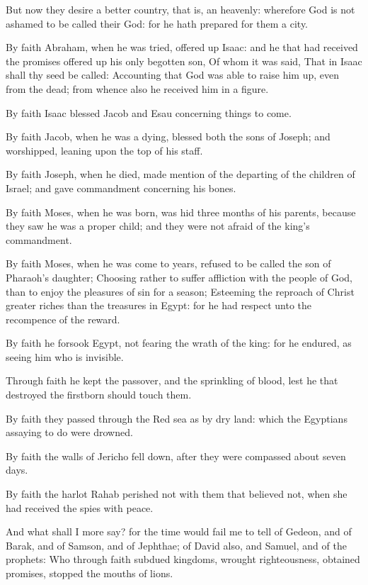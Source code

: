 \Verse But now they desire a better country, that is, an heavenly: wherefore God is not ashamed to be called their God: for he hath prepared for them a city.

\Verse By faith Abraham, when he was tried, offered up Isaac: and he that had received the promises offered up his only begotten son, \Verse Of whom it was said, That in Isaac shall thy seed be called: \Verse Accounting that God was able to raise him up, even from the dead; from whence also he received him in a figure.

\Verse By faith Isaac blessed Jacob and Esau concerning things to come.

\Verse By faith Jacob, when he was a dying, blessed both the sons of Joseph; and worshipped, leaning upon the top of his staff.

\Verse By faith Joseph, when he died, made mention of the departing of the children of Israel; and gave commandment concerning his bones.

\Verse By faith Moses, when he was born, was hid three months of his parents, because they saw he was a proper child; and they were not afraid of the king's commandment.

\Verse By faith Moses, when he was come to years, refused to be called the son of Pharaoh's daughter; \Verse Choosing rather to suffer affliction with the people of God, than to enjoy the pleasures of sin for a season; \Verse Esteeming the reproach of Christ greater riches than the treasures in Egypt: for he had respect unto the recompence of the reward.

\Verse By faith he forsook Egypt, not fearing the wrath of the king: for he endured, as seeing him who is invisible.

\Verse Through faith he kept the passover, and the sprinkling of blood, lest he that destroyed the firstborn should touch them.

\Verse By faith they passed through the Red sea as by dry land: which the Egyptians assaying to do were drowned.

\Verse By faith the walls of Jericho fell down, after they were compassed about seven days.

\Verse By faith the harlot Rahab perished not with them that believed not, when she had received the spies with peace.

\Verse And what shall I more say? for the time would fail me to tell of Gedeon, and of Barak, and of Samson, and of Jephthae; of David also, and Samuel, and of the prophets: \Verse Who through faith subdued kingdoms, wrought righteousness, obtained promises, stopped the mouths of lions.

